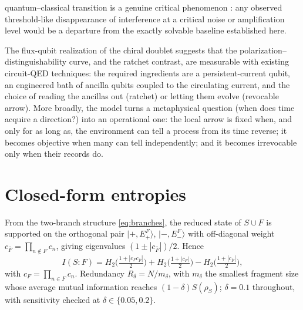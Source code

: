 \documentclass[11pt]{article}
\begin{document}
quantum--classical transition is a genuine critical phenomenon \cite{Aharonov2000}: any observed threshold-like disappearance of interference at a critical noise or amplification level would be a departure from the exactly solvable baseline established here.

The flux-qubit realization of the chiral doublet \cite{Friedman2000} suggests that the polarization--distinguishability curve, and the ratchet contrast, are measurable with existing circuit-QED techniques: the required ingredients are a persistent-current qubit, an engineered bath of ancilla qubits coupled to the circulating current, and the choice of reading the ancillas out (ratchet) or letting them evolve (revocable arrow). More broadly, the model turns a metaphysical question (when does time acquire a direction?) into an operational one: the local arrow is fixed when, and only for as long as, the environment can tell a process from its time reverse; it becomes objective when many can tell independently; and it becomes irrevocable only when their records do.

\appendix

\section{Closed-form entropies}\label{app:entropies}
From the two-branch structure \eqref{eq:branches}, the reduced state of $S\cup F$ is supported on the orthogonal pair $|{+},E_+^F\rangle$, $|{-},E_-^F\rangle$ with off-diagonal weight $c_{\bar F}=\prod_{n\notin F}c_n$, giving eigenvalues $(1\pm|c_{\bar F}|)/2$. Hence
\begin{equation}
I(S{:}F) = H_2\!\Big(\tfrac{1+|c_Fc_{\bar F}|}{2}\Big) + H_2\!\Big(\tfrac{1+|c_F|}{2}\Big) - H_2\!\Big(\tfrac{1+|c_{\bar F}|}{2}\Big),
\end{equation}
with $c_F=\prod_{n\in F}c_n$. Redundancy $R_\delta = N/m_\delta$, with $m_\delta$ the smallest fragment size whose average mutual information reaches $(1-\delta)S(\rho_S)$; $\delta=0.1$ throughout, with sensitivity checked at $\delta\in\{0.05,0.2\}$.
\end{document}
